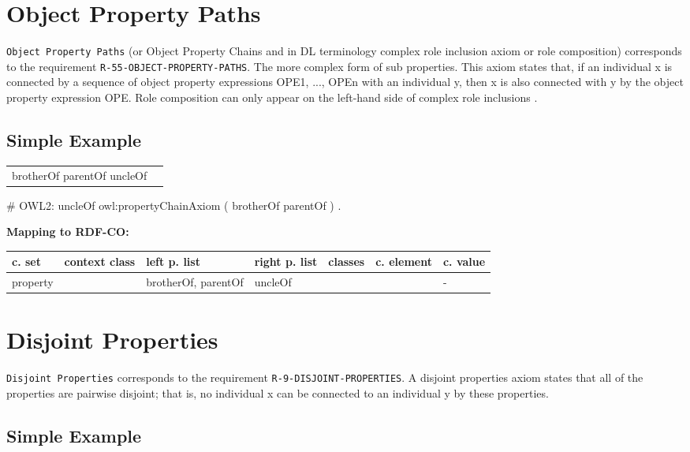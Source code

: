 \documentclass{llncs}
\newcommand{\ms}[1]{\texttt{#1}}
\newenvironment{gcotable}{
  \scriptsize
  \sffamily
  \vspace{0cm}
	\begin{center}
	\textbf{\vspace{0.4cm}Mapping to RDF-CO:} \\
  \begin{tabular}{l|l|l|l|l|l|l}
	\hline
  \textbf{c. set} & \textbf{context class} & \textbf{left p. list} & \textbf{right p. list} & \textbf{classes} & \textbf{c. element} & \textbf{c. value} \\
  \hline

}{
  \hline
  \end{tabular}
	\end{center}
}
\newenvironment{DL}{
\vspace{0cm}
	\begin{center}
  \begin{tabular}{r l}

}{
  \end{tabular}
	\end{center}
}
\begin{document}
\begin{DL}
  
\end{DL}

\section{Object Property Paths}

\ms{Object Property Paths} (or Object Property Chains and in DL terminology complex role inclusion axiom or role composition)
corresponds to the requirement \ms{R-55-OBJECT-PROPERTY-PATHS}.
The more complex form of sub properties. This axiom states that, if an individual x is connected by a sequence of object property expressions OPE1, ..., OPEn with an individual y, then x is also connected with y by the object property expression OPE.  
Role composition can only appear on the left-hand side of complex role inclusions \cite{Kroetzsch2012}.

\subsection{Simple Example}

\begin{DL}
brotherOf  parentOf  uncleOf 
\end{DL}

\begin{ex}
# OWL2:
uncleOf owl:propertyChainAxiom ( brotherOf parentOf ) . 
\end{ex}

\begin{gcotable}
property &  & brotherOf, parentOf & uncleOf &  &  & -  \\
\end{gcotable}

\section{Disjoint Properties}

\ms{Disjoint Properties} corresponds to the requirement \ms{R-9-DISJOINT-PROPERTIES}.
A disjoint properties axiom states that all of the properties are pairwise disjoint; 
that is, no individual x can be connected to an individual y by these properties. 

\subsection{Simple Example}
\end{document}

